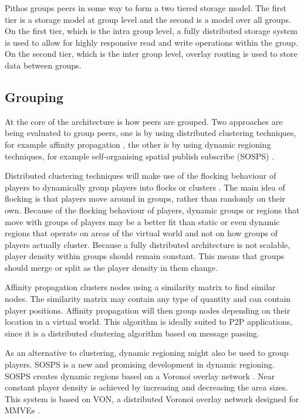 \documentclass[10pt,a4paper,conference]{IEEEtran}
\begin{document}
Pithos groups peers in some way to form a two tiered storage model. The first tier is a storage model at group level and the second is a model over
all groups. On the first tier, which is the intra group level, a fully distributed storage system is used to allow for highly responsive read and
write operations within the group. On the second tier, which is the inter group level, overlay routing is used to store data between groups.

\subsection{Grouping}

At the core of the architecture is how peers are grouped. Two approaches are being evaluated to group peers, one is by using distributed clustering
techniques, for example affinity propagation \cite{affinity_propagation}, the other is by using dynamic regioning techniques, for example
self-organising spatial publish subscribe (SOSPS) \cite{self_organising_sps_post}.

Distributed clustering techniques will make use of the flocking behaviour of players to dynamically group players into flocks or clusters
\cite{flocking}. The main idea of flocking is that players move around in groups, rather than randomly on their own. Because of the flocking
behaviour of players, dynamic groups or regions that move with groups of players may be a better fit than static or even dynamic regions that operate
on areas of the virtual world and not on how groups of players actually cluster. Because a fully distributed architecture is not scalable, player
density within groups should remain constant. This means that groups should merge or split as the player density in them change.

Affinity propagation clusters nodes using a similarity matrix to find similar nodes. The similarity matrix may contain any type of quantity and can
contain player positions. Affinity propagation will then group nodes depending on their location in a virtual world. This algorithm is ideally suited
to P2P applications, since it is a distributed clustering algorithm based on message passing.

As an alternative to clustering, dynamic regioning might also be used to group players. SOSPS is a new and promising development in dynamic
regioning. SOSPS creates dynamic regions based on a Voronoi overlay network \cite{voronoi_diagrams_survey}. Near constant player density is achieved
by increasing and decreasing the area sizes. This system is based on VON, a distributed Voronoi overlay network designed for MMVEs \cite{VON_VAST}.
\end{document}
